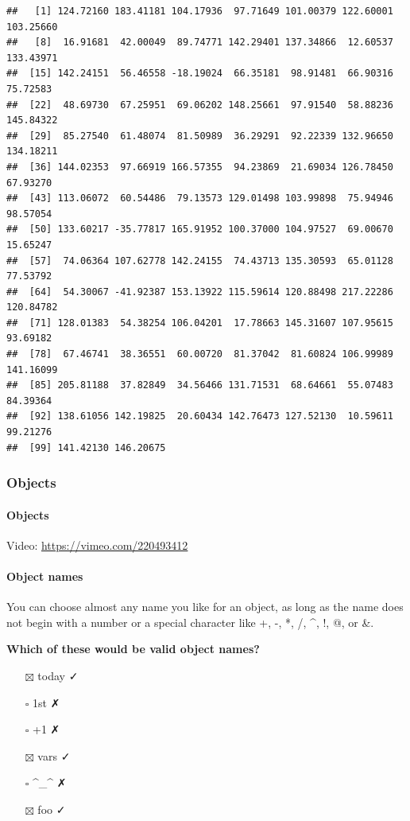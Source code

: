 \documentclass[
]{article}
\providecommand{\tightlist}{%
  \setlength{\itemsep}{0pt}\setlength{\parskip}{0pt}}
\begin{document}
\begin{verbatim}
##   [1] 124.72160 183.41181 104.17936  97.71649 101.00379 122.60001 103.25660
##   [8]  16.91681  42.00049  89.74771 142.29401 137.34866  12.60537 133.43971
##  [15] 142.24151  56.46558 -18.19024  66.35181  98.91481  66.90316  75.72583
##  [22]  48.69730  67.25951  69.06202 148.25661  97.91540  58.88236 145.84322
##  [29]  85.27540  61.48074  81.50989  36.29291  92.22339 132.96650 134.18211
##  [36] 144.02353  97.66919 166.57355  94.23869  21.69034 126.78450  67.93270
##  [43] 113.06072  60.54486  79.13573 129.01498 103.99898  75.94946  98.57054
##  [50] 133.60217 -35.77817 165.91952 100.37000 104.97527  69.00670  15.65247
##  [57]  74.06364 107.62778 142.24155  74.43713 135.30593  65.01128  77.53792
##  [64]  54.30067 -41.92387 153.13922 115.59614 120.88498 217.22286 120.84782
##  [71] 128.01383  54.38254 106.04201  17.78663 145.31607 107.95615  93.69182
##  [78]  67.46741  38.36551  60.00720  81.37042  81.60824 106.99989 141.16099
##  [85] 205.81188  37.82849  34.56466 131.71531  68.64661  55.07483  84.39364
##  [92] 138.61056 142.19825  20.60434 142.76473 127.52130  10.59611  99.21276
##  [99] 141.42130 146.20675
\end{verbatim}

\hypertarget{objects}{%
\subsubsection{Objects}\label{objects}}

\hypertarget{objects-1}{%
\paragraph{Objects}\label{objects-1}}

Video: \url{https://vimeo.com/220493412}

\hypertarget{object-names}{%
\paragraph{Object names}\label{object-names}}

You can choose almost any name you like for an object, as long as the
name does not begin with a number or a special character like +, -, *,
/, \^{}, !, @, or \&.

\textbf{Which of these would be valid object names?}

\begin{itemize}
\tightlist
\item[$\boxtimes$]
  today ✓
\item[$\square$]
  1st ✗
\item[$\square$]
  +1 ✗
\item[$\boxtimes$]
  vars ✓
\item[$\square$]
  \^{}\_\^{} ✗
\item[$\boxtimes$]
  foo ✓
\end{itemize}
\end{document}
